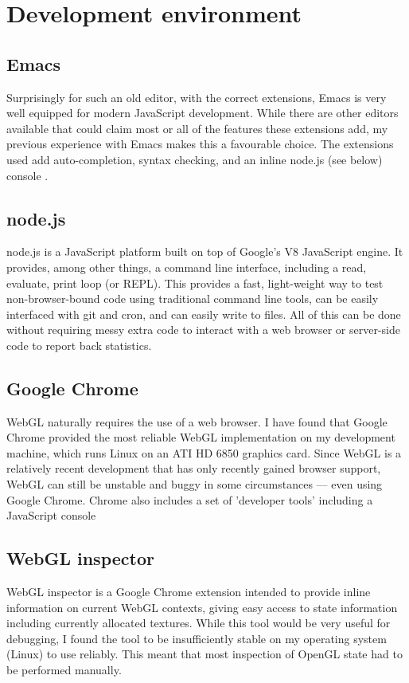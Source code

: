 \documentclass[12pt,twoside,notitlepage]{report}
\begin{document}
\section{Development environment}
\subsection*{Emacs}
Surprisingly for such an old editor, with the correct extensions, Emacs is very well equipped for modern JavaScript development. While there are other editors available that could claim most or all of the features these extensions add, my previous experience with Emacs makes this a favourable choice. The extensions used add auto-completion, syntax checking, and an inline node.js (see below) console \citet{emacs-js}.

\subsection*{node.js}
node.js is a JavaScript platform built on top of Google's V8 JavaScript engine\citet{v8}. It provides, among other things, a command line interface, including a read, evaluate, print loop (or REPL). This provides a fast, light-weight way to test non-browser-bound code using traditional command line tools, can be easily interfaced with git and cron, and can easily write to files. All of this can be done without requiring messy extra code to interact with a web browser or server-side code to report back statistics.

\subsection*{Google Chrome}
WebGL naturally requires the use of a web browser. I have found that Google Chrome provided the most reliable WebGL implementation on my development machine, which runs Linux on an ATI HD 6850 graphics card. Since {WebGL} is a relatively recent development that has only recently gained browser support, WebGL can still be unstable and buggy in some circumstances --- even using Google Chrome. Chrome also includes a set of 'developer tools' including a JavaScript console 

\subsection*{WebGL inspector}
WebGL inspector is a Google Chrome extension intended to provide inline information on current WebGL contexts, giving easy access to state information including currently allocated textures. While this tool would be very useful for debugging, I found the tool to be insufficiently stable on my operating system (Linux) to use reliably. This meant that most inspection of OpenGL state had to be performed manually.
\end{document}
